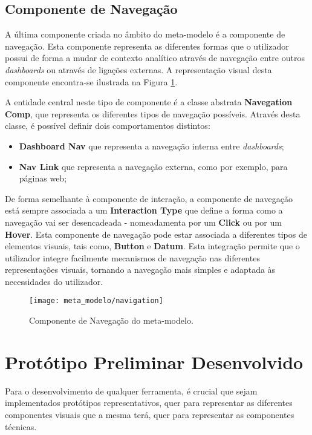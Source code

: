 \subsection{Componente de Navegação} %
\label{sub:nav_diagram}

A última componente criada no âmbito do meta-modelo é a componente de navegação. Esta componente representa as diferentes formas que o utilizador possui de forma a mudar de contexto analítico através de navegação entre outros \textit{dashboards} ou através de ligações externas. A representação visual desta componente encontra-se ilustrada na Figura \ref{fig:navigation}.

A entidade central neste tipo de componente é a classe abstrata \textbf{Navegation Comp}, que representa os diferentes tipos de navegação possíveis. Através desta classe, é possível definir dois comportamentos distintos:

\begin{itemize}
    \item \textbf{Dashboard Nav} que representa a navegação interna entre \textit{dashboards};
    \item \textbf{Nav Link} que representa a navegação externa, como por exemplo, para páginas web;
\end{itemize}

De forma semelhante à componente de interação, a componente de navegação está sempre associada a um \textbf{Interaction Type} que define a forma como a navegação vai ser desencadeada - nomeadamenta por um \textbf{Click} ou por um \textbf{Hover}. Esta componente de navegação pode estar associada a diferentes tipos de elementos visuais, tais como, \textbf{Button} e \textbf{Datum}. Esta integração permite que o utilizador integre facilmente mecanismos de navegação nas diferentes representações visuais, tornando a navegação mais simples e adaptada às necessidades do utilizador.

\begin{figure}[htbp]
  \texttt{[image: meta\_modelo/navigation]}
  \centering
  \caption{Componente de Navegação do meta-modelo.}
  \label{fig:navigation}
\end{figure}

\section{Protótipo Preliminar Desenvolvido} %
\label{sec:prototipo_preliminar}

Para o desenvolvimento de qualquer ferramenta, é crucial que sejam implementados protótipos representativos, quer para representar as diferentes componentes visuais que a mesma terá, quer para representar as componentes técnicas.


